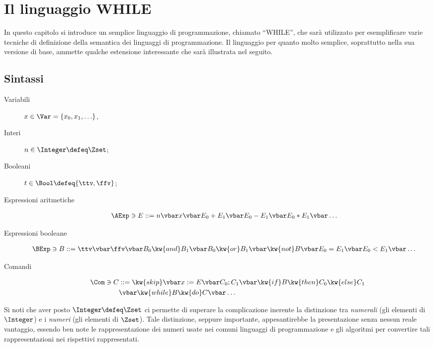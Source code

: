 

\chapter{Il linguaggio WHILE}

In questo capitolo si introduce un semplice linguaggio di programmazione,
chiamato ``WHILE'',
che sarà utilizzato per esemplificare varie tecniche di definizione della
semantica dei linguaggi di programmazione.
Il linguaggio per quanto molto semplice, soprattutto nella sua versione di
base, ammette qualche estensione interessante che sarà illustrata nel
seguito.

\section{Sintassi}

\begin{description}
\item[Variabili]
$x \in \Var = \{ x_0, x_1, \ldots \}$,%
\item[Interi]
$n \in \Integer \defeq \Zset$;
\item[Booleani]
$t \in \Bool \defeq \{ \ttv, \ffv \}$;
\item[Espressioni aritmetiche]%
\begin{align*}
  \AExp \ni
  E &::= n \vbar x \vbar E_0 + E_1 \vbar E_0 - E_1 \vbar E_0 * E_1 \vbar \ldots
\end{align*}
\item[Espressioni booleane]%
\begin{align*}
  \BExp \ni
  B &::= \ttv \vbar \ffv \vbar B_0 \kw{and} B_1 \vbar B_0 \kw{or} B_1
              \vbar \kw{not} B \vbar E_0 = E_1 \vbar E_0 < E_1 \vbar \ldots
\end{align*}
\item[Comandi]%
\begin{align*}
  \Com \ni
  C &::= \kw{skip} \vbar x := E \vbar C_0 ; C_1
         \vbar \kw{if} B \kw{then} C_0 \kw{else} C_1 \\
    &\vbar \kw{while} B \kw{do} C \vbar \ldots
\end{align*}
\end{description}

Si noti che aver posto $\Integer \defeq \Zset$ ci permette di superare
la complicazione inerente la distinzione tra \emph{numerali} (gli elementi
di $\Integer$) e i \emph{numeri} (gli elementi di $\Zset$).
Tale distinzione, seppure importante, appesantirebbe la presentazione
senza nessun reale vantaggio, essendo ben note le rappresentazione
dei numeri usate nei comuni linguaggi di programmazione e gli algoritmi
per convertire tali rappresentazioni nei rispettivi rappresentati.

